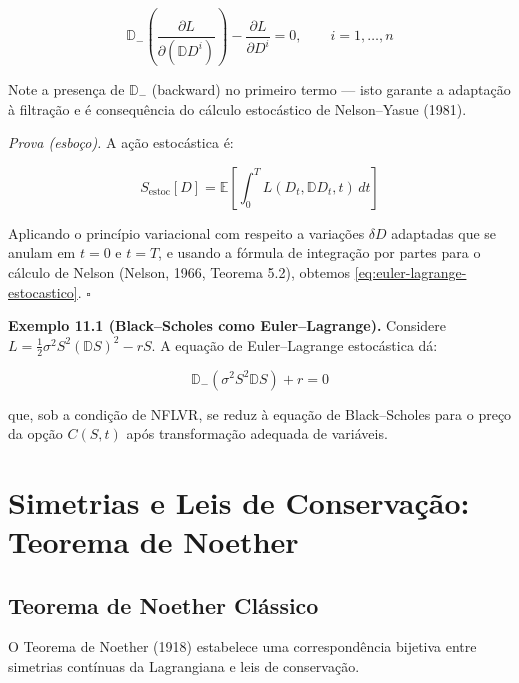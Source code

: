 \begin{equation}\label{eq:euler-lagrange-estocastico}
\mathbb{D}_-\left(\frac{\partial L}{\partial (\mathbb{D}D^i)}\right) - \frac{\partial L}{\partial D^i} = 0, \qquad i = 1,\dots,n
\end{equation}

Note a presen\c{c}a de $\mathbb{D}_-$ (backward) no primeiro termo --- isto garante a adapta\c{c}\~ao \`a filtra\c{c}\~ao e \'e consequ\^encia do c\'alculo estoc\'astico de Nelson--Yasue (1981).

\medskip
\noindent\textit{Prova (esbo\c{c}o).} A a\c{c}\~ao estoc\'astica \'e:

\begin{equation}\label{eq:acao-estocastica}
S_{\text{estoc}}[D] = \mathbb{E}\left[ \int_0^T L(D_t, \mathbb{D}D_t, t) \, dt \right]
\end{equation}

Aplicando o princ\'ipio variacional com respeito a varia\c{c}\~oes $\delta D$ adaptadas que se anulam em $t=0$ e $t=T$, e usando a f\'ormula de integra\c{c}\~ao por partes para o c\'alculo de Nelson (Nelson, 1966, Teorema 5.2), obtemos \eqref{eq:euler-lagrange-estocastico}. $\square$

\smallskip
\noindent\textbf{Exemplo 11.1 (Black--Scholes como Euler--Lagrange).} Considere $L = \frac{1}{2}\sigma^2 S^2 (\mathbb{D}S)^2 - rS$. A equa\c{c}\~ao de Euler--Lagrange estoc\'astica d\'a:

\begin{equation}
\mathbb{D}_-(\sigma^2 S^2 \mathbb{D}S) + r = 0
\end{equation}

que, sob a condi\c{c}\~ao de NFLVR, se reduz \`a equa\c{c}\~ao de Black--Scholes para o pre\c{c}o da op\c{c}\~ao $C(S,t)$ ap\'os transforma\c{c}\~ao adequada de vari\'aveis.

\section{Simetrias e Leis de Conserva\c{c}\~ao: Teorema de Noether}

\subsection{Teorema de Noether Cl\'assico}

O Teorema de Noether (1918) estabelece uma correspond\^encia bijetiva entre simetrias cont\'inuas da Lagrangiana e leis de conserva\c{c}\~ao.

